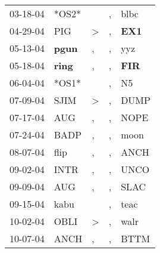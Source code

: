 \begin{supertabular}{p{0.07\textwidth}p{0.06\textwidth}p{0.02\textwidth}p{0.02\textwidth}p{0.06\textwidth}}
          03-18-04\textsuperscript{} &                            *OS2* &                  &                , &           blbc\textsuperscript{} \\
          04-29-04\textsuperscript{} &            PIG\textsuperscript{} &     \textgreater &                , &   \textbf{EX1\textsuperscript{}} \\
          05-13-04\textsuperscript{} &  \textbf{pgun\textsuperscript{}} &                , &                , &            yyz\textsuperscript{} \\
          05-18-04\textsuperscript{} &  \textbf{ring\textsuperscript{}} &                , &                , &   \textbf{FIR\textsuperscript{}} \\
          06-04-04\textsuperscript{} &                            *OS1* &                  &                , &             N5\textsuperscript{} \\
          07-09-04\textsuperscript{} &           SJIM\textsuperscript{} &     \textgreater &                , &           DUMP\textsuperscript{} \\
          07-17-04\textsuperscript{} &            AUG\textsuperscript{} &                , &                , &           NOPE\textsuperscript{} \\
          07-24-04\textsuperscript{} &           BADP\textsuperscript{} &                , &                , &           moon\textsuperscript{} \\
          08-07-04\textsuperscript{} &           flip\textsuperscript{} &                , &                , &           ANCH\textsuperscript{} \\
          09-02-04\textsuperscript{} &           INTR\textsuperscript{} &                , &                , &           UNCO\textsuperscript{} \\
          09-09-04\textsuperscript{} &            AUG\textsuperscript{} &                , &                , &           SLAC\textsuperscript{} \\
          09-15-04\textsuperscript{} &           kabu\textsuperscript{} &                  &                , &           teac\textsuperscript{} \\
          10-02-04\textsuperscript{} &           OBLI\textsuperscript{} &     \textgreater &                , &           walr\textsuperscript{} \\
          10-07-04\textsuperscript{} &           ANCH\textsuperscript{} &                , &                , &           BTTM\textsuperscript{} \\

\end{supertabular}
